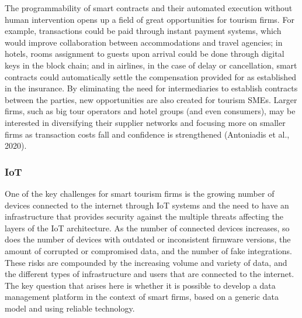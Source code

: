\documentclass[
  letterpaper,
  DIV=11,
  numbers=noendperiod]{scrreprt}
\begin{document}
The programmability of smart contracts and their automated execution
without human intervention opens up a field of great opportunities for
tourism firms. For example, transactions could be paid through instant
payment systems, which would improve collaboration between
accommodations and travel agencies; in hotels, rooms assignment to
guests upon arrival could be done through digital keys in the block
chain; and in airlines, in the case of delay or cancellation, smart
contracts could automatically settle the compensation provided for as
established in the insurance. By eliminating the need for intermediaries
to establish contracts between the parties, new opportunities are also
created for tourism SMEs. Larger firms, such as big tour operators and
hotel groups (and even consumers), may be interested in diversifying
their supplier networks and focusing more on smaller firms as
transaction costs fall and confidence is strengthened (Antoniadis et
al., 2020).

\hypertarget{iot}{%
\subsubsection{IoT}\label{iot}}

One of the key challenges for smart tourism firms is the growing number
of devices connected to the internet through IoT systems and the need to
have an infrastructure that provides security against the multiple
threats affecting the layers of the IoT architecture. As the number of
connected devices increases, so does the number of devices with outdated
or inconsistent firmware versions, the amount of corrupted or
compromised data, and the number of fake integrations. These risks are
compounded by the increasing volume and variety of data, and the
different types of infrastructure and users that are connected to the
internet. The key question that arises here is whether it is possible to
develop a data management platform in the context of smart firms, based
on a generic data model and using reliable technology.
\end{document}
